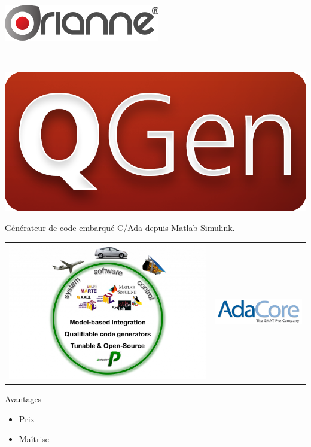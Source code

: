 \documentclass[xcolor=x11names,compress]{beamer}
\begin{document}
\begin{frame}{\vspace{-17pt}\\\includegraphics[scale=0.4]{images/orianne}}
\begin{center}
{\begin{tabular}[h]{m{110pt}m{53pt}m{125pt}}
	  \end{tabular}
	}
  \end{center}
\end{frame}

\begin{frame}{\vspace{-17pt}\\\includegraphics[scale=0.05]{images/qgen}}
  \begin{center}
	Générateur de code embarqué C/Ada depuis Matlab Simulink.\\
	\vfill
	\begin{tabular}[h]{m{150pt}m{150pt}}
	  \includegraphics[scale=0.14]{images/projectp}&
	  \includegraphics[scale=0.24]{images/adacore.png}\\
	\end{tabular}
	\vfill
	\begin{exampleblock}{Avantages}{}
	  \begin{itemize}
		\item Prix
		\item Maîtrise
	  \end{itemize}
	\end{exampleblock}
  \end{center}
\end{frame}
\end{document}
